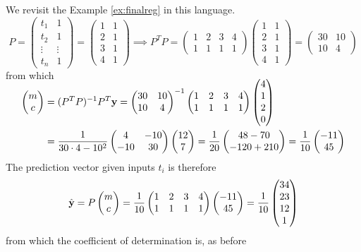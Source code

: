 \goodbreak


\begin{examples}{}{}
	\exstart We revisit the Example \ref{ex:finalreg} in this language.
	\[
		P=
		\begin{pmatrix}
			t_1&1\\
			t_2&1\\
			\vdots&\vdots\\
			t_n&1
		\end{pmatrix}
		=
		\begin{pmatrix}
			1&1\\
			2&1\\
			3&1\\
			4&1
		\end{pmatrix}
		\implies P^TP=
		\begin{pmatrix}
			1&2&3&4\\
			1&1&1&1
		\end{pmatrix}
		\begin{pmatrix}
			1&1\\
			2&1\\
			3&1\\
			4&1
		\end{pmatrix}
		=
		\begin{pmatrix}
			30&10\\
			10&4
		\end{pmatrix}
	\]
	from which
	\begin{align*}
		\begin{pmatrix}m\\c\end{pmatrix}&=(P^TP)^{-1}P^T{\mathbf{y}} =
		\begin{pmatrix}
			30&10\\
			10&4
		\end{pmatrix}^{-1}
		\begin{pmatrix}
			1&2&3&4\\
			1&1&1&1
		\end{pmatrix}
		\smash[t]{\begin{pmatrix}4\\1\\2\\0\end{pmatrix}}\\
		&=\frac 1{30\cdot 4-10^2}
		\begin{pmatrix}
			4&-10\\
			-10&30
		\end{pmatrix}
		\begin{pmatrix}12\\7\end{pmatrix} =\frac 1{20}\begin{pmatrix}48-70\\-120+210\end{pmatrix}=\frac 1{10}\begin{pmatrix}-11\\45\end{pmatrix}
	\end{align*}
	The prediction vector given inputs $t_i$ is therefore
	\[
		\hat{{\mathbf{y}}}=P\begin{pmatrix}m\\c\end{pmatrix}=\frac 1{10}
		\begin{pmatrix}
			1&2&3&4\\
			1&1&1&1
		\end{pmatrix}
		\begin{pmatrix}-11\\45\end{pmatrix} =\frac 1{10}\begin{pmatrix}34\\23\\12\\1\end{pmatrix}
	\]
	from which the coefficient of determination is, as before

\end{examples}
